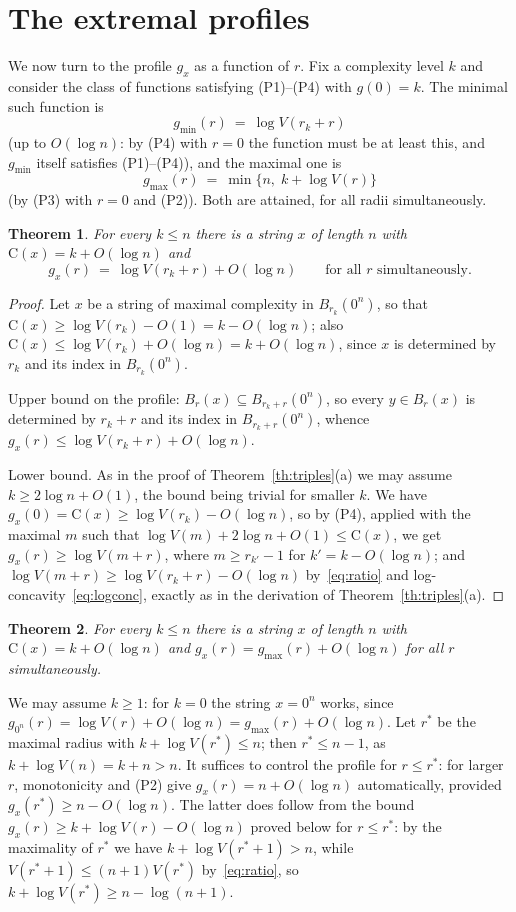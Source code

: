 \documentclass[11pt,a4paper]{article}
\newtheorem{theorem}{Theorem}
\theoremstyle{definition}
\newcommand{\C}{\mathrm{C}}
\renewcommand{\le}{\leqslant}
\renewcommand{\ge}{\geqslant}
\begin{document}
\section{The extremal profiles}\label{sec:extremal}

We now turn to the profile $g_x$ as a function of $r$. Fix a complexity level $k$ and
consider the class of functions satisfying (P1)--(P4) with $g(0)=k$. The
minimal such function is
\[
  g_{\min}(r)\ =\ \log V(r_k+r)
\]
(up to $O(\log n)$: by (P4) with $r=0$ the function must be at least this, and
$g_{\min}$ itself satisfies (P1)--(P4)), and the maximal one is
\[
  g_{\max}(r)\ =\ \min\{n,\;k+\log V(r)\}
\]
(by (P3) with $r=0$ and (P2)). Both are attained, for all radii simultaneously.

\begin{theorem}\label{th:gmin}
For every $k\le n$ there is a string $x$ of length $n$ with
$\C(x)=k+O(\log n)$ and
\[
  g_x(r)\ =\ \log V(r_k+r)+O(\log n)
  \qquad\text{for all $r$ simultaneously.}
\]
\end{theorem}

\begin{proof}
Let  $x$ be a string of maximal complexity in $B_{r_k}(0^n)$, so
that $\C(x)\ge\log V({r_k})-O(1)=k-O(\log n)$; also $\C(x)\le\log V({r_k})+O(\log
n)=k+O(\log n)$, since $x$ is determined by ${r_k}$ and its index in $B_{r_k}(0^n)$.

Upper bound on the profile: $B_r(x)\subseteq B_{{r_k}+r}(0^n)$, so every
$y\in B_r(x)$ is determined by ${r_k}+r$ and its index in $B_{{r_k}+r}(0^n)$, whence
$g_x(r)\le\log V({r_k}+r)+O(\log n)$.

Lower bound. As in the proof of Theorem~\ref{th:triples}(a) we may assume
$k\ge2\log n+O(1)$, the bound being trivial for smaller $k$. We have
$g_x(0)=\C(x)\ge\log V({r_k})-O(\log n)$, so by (P4), applied with the
maximal $m$ such that $\log V(m)+2\log n+O(1)\le\C(x)$, we get
$g_x(r)\ge\log V(m+r)$, where $m\ge r_{k'}-1$ for $k'=k-O(\log n)$; and
$\log V(m+r)\ge\log V(r_k+r)-O(\log n)$ by~\eqref{eq:ratio} and
log-concavity~\eqref{eq:logconc}, exactly as in the derivation of
Theorem~\ref{th:triples}(a).
\end{proof}

\begin{theorem}\label{th:gmax}
For every $k\le n$ there is a string $x$ of length $n$ with $\C(x)=k+O(\log n)$
and $g_x(r)=g_{\max}(r)+O(\log n)$ for all $r$ simultaneously.
\end{theorem}

We may assume $k\ge1$: for $k=0$ the string $x=0^n$ works, since
$g_{0^n}(r)=\log V(r)+O(\log n)=g_{\max}(r)+O(\log n)$. Let $r^*$ be the
maximal radius with $k+\log V(r^*)\le n$; then $r^*\le n-1$, as
$k+\log V(n)=k+n>n$. It suffices to
control the profile for $r\le r^*$: for larger $r$, monotonicity and (P2) give
$g_x(r)=n+O(\log n)$ automatically, provided $g_x(r^*)\ge n-O(\log n)$. The
latter does follow from the bound $g_x(r)\ge k+\log V(r)-O(\log n)$ proved
below for $r\le r^*$: by the maximality of $r^*$ we have $k+\log V(r^*+1)>n$,
while $V(r^*+1)\le(n+1)V(r^*)$ by~\eqref{eq:ratio}, so
$k+\log V(r^*)\ge n-\log(n+1)$.
\end{document}
